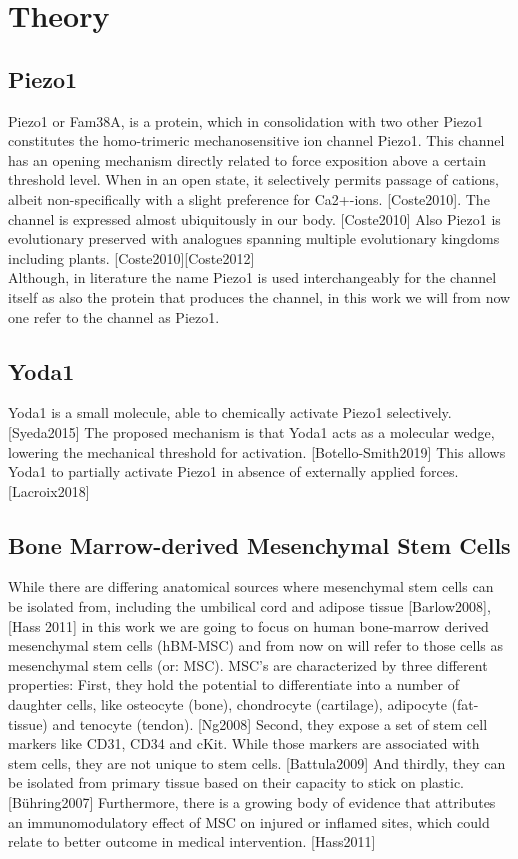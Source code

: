 \section{Theory}

\subsection{Piezo1}


Piezo1 or Fam38A, is a protein, which in consolidation with two other Piezo1 constitutes the homo-trimeric mechanosensitive ion channel Piezo1. This channel has an opening mechanism directly related to force exposition above a certain threshold level. When in an open state, it selectively permits passage of cations, albeit non-specifically with a slight preference for Ca2+-ions. [Coste2010]. The channel is expressed almost ubiquitously in our body. [Coste2010] Also Piezo1 is evolutionary preserved with analogues spanning multiple evolutionary kingdoms including plants. [Coste2010][Coste2012]\\
Although, in literature the name Piezo1 is used interchangeably for the channel itself as also the protein that produces the channel, in this work we will from now one refer to the channel as Piezo1.

\subsection{Yoda1}
Yoda1 is a small molecule, able to chemically activate Piezo1 selectively. [Syeda2015] The proposed mechanism is that Yoda1 acts as a molecular wedge, lowering the mechanical threshold for activation. [Botello-Smith2019] This allows Yoda1 to partially activate Piezo1 in absence of externally applied forces. [Lacroix2018]

\subsection{Bone Marrow-derived Mesenchymal Stem Cells}
While there are differing anatomical sources where mesenchymal stem cells can be isolated from, including the umbilical cord and adipose tissue [Barlow2008], [Hass 2011] in this work we are going to focus on human bone-marrow derived mesenchymal stem cells (hBM-MSC) and from now on will refer to those cells as mesenchymal stem cells (or: MSC). \hfill \newline 
MSC's are characterized by three different properties: First, they hold the potential to differentiate into a number of daughter cells, like osteocyte (bone), chondrocyte (cartilage), adipocyte (fat-tissue) and tenocyte (tendon). [Ng2008] Second, they expose a set of stem cell markers like CD31, CD34 and cKit. While those markers are associated with stem cells, they are not unique to stem cells. [Battula2009] And thirdly, they can be isolated from primary tissue based on their capacity to stick on plastic. [Bühring2007] Furthermore, there is a growing body of evidence that attributes an immunomodulatory effect of MSC on injured or inflamed sites, which could relate to better outcome in medical intervention. [Hass2011]


